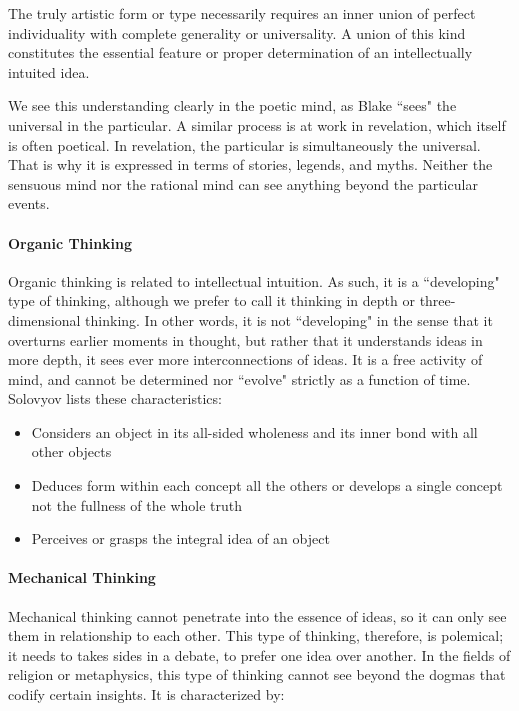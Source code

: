 \begin{quotex}
The truly artistic form or type necessarily requires an inner union of perfect individuality with complete generality or universality. A union of this kind constitutes the essential feature or proper determination of an intellectually intuited idea. 

\end{quotex}
We see this understanding clearly in the poetic mind, as Blake ``sees" the universal in the particular. A similar process is at work in revelation, which itself is often poetical. In revelation, the particular is simultaneously the universal. That is why it is expressed in terms of stories, legends, and myths. Neither the sensuous mind nor the rational mind can see anything beyond the particular events.

\paragraph{Organic Thinking}
Organic thinking is related to intellectual intuition. As such, it is a ``developing" type of thinking, although we prefer to call it thinking in depth or three-dimensional thinking. In other words, it is not ``developing" in the sense that it overturns earlier moments in thought, but rather that it understands ideas in more depth, it sees ever more interconnections of ideas. It is a free activity of mind, and cannot be determined nor ``evolve" strictly as a function of time. Solovyov lists these characteristics:

\begin{itemize}
\item Considers an object in its all-sided wholeness and its inner bond with all other objects 
\item Deduces form within each concept all the others or develops a single concept not the fullness of the whole truth 
\item Perceives or grasps the integral idea of an object 
\end{itemize}
\paragraph{Mechanical Thinking}
Mechanical thinking cannot penetrate into the essence of ideas, so it can only see them in relationship to each other. This type of thinking, therefore, is polemical; it needs to takes sides in a debate, to prefer one idea over another. In the fields of religion or metaphysics, this type of thinking cannot see beyond the dogmas that codify certain insights. It is characterized by:

